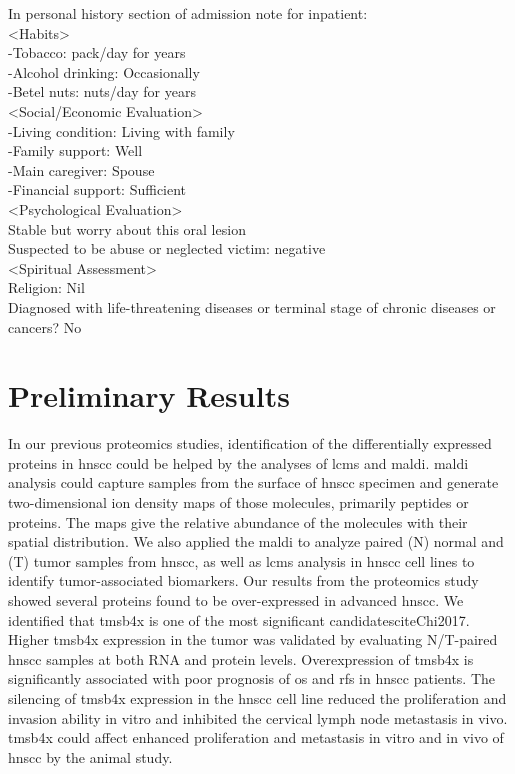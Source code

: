 \documentclass[12pt, a4paper]{article}
\begin{document}
In personal history section of admission note for inpatient:\\
<Habits>\\
-Tobacco: \underline{ }\underline{ } pack/day for \underline{ }\underline{ } years\\
-Alcohol drinking: Occasionally\\
-Betel nuts: \underline{ }\underline{ } nuts/day for \underline{ }\underline{ } years\\
<Social/Economic Evaluation>\\
-Living condition: Living with family\\
-Family support: Well\\
-Main caregiver: Spouse\\
-Financial support: Sufficient\\
<Psychological Evaluation>\\
Stable but worry about this oral lesion\\
Suspected to be abuse or neglected victim: negative\\
<Spiritual Assessment>\\
Religion: Nil\\
Diagnosed with life-threatening diseases or terminal stage of chronic diseases or cancers? No


\section*{Preliminary Results}
In our previous proteomics studies\cite{Tai2007}, identification of the differentially expressed proteins in \acrshort{hnscc} could be helped by the analyses of \acrfull{lcms} and \acrfull{maldi}. \acrshort{maldi} analysis could capture samples from the surface of \acrshort{hnscc} specimen and generate two-dimensional ion density maps of those molecules, primarily peptides or proteins. The maps give the relative abundance of the molecules with their spatial distribution.
We also applied the \acrshort{maldi} to analyze paired (N) normal and (T) tumor samples from \acrshort{hnscc}, as well as \acrshort{lcms} analysis in \acrshort{hnscc} cell lines to identify tumor-associated biomarkers. 
Our results from the proteomics study showed several proteins found to be over-expressed in advanced \acrshort{hnscc}. 
We identified that \acrfull{tmsb4x} is one of the most significant candidatescite{Chi2017}. Higher \acrshort{tmsb4x} expression in the tumor was validated by evaluating N/T-paired \acrshort{hnscc} samples at both RNA and protein levels. Overexpression of \acrshort{tmsb4x} is significantly associated with poor prognosis of \acrshort{os} and \acrfull{rfs} in \acrshort{hnscc} patients. The silencing of \acrshort{tmsb4x} expression in the \acrshort{hnscc} cell line reduced the proliferation and invasion ability in vitro and inhibited the cervical lymph node metastasis in vivo. 
\acrshort{tmsb4x} could affect enhanced proliferation and metastasis in vitro and in vivo of \acrshort{hnscc} by the animal study.
\end{document}

